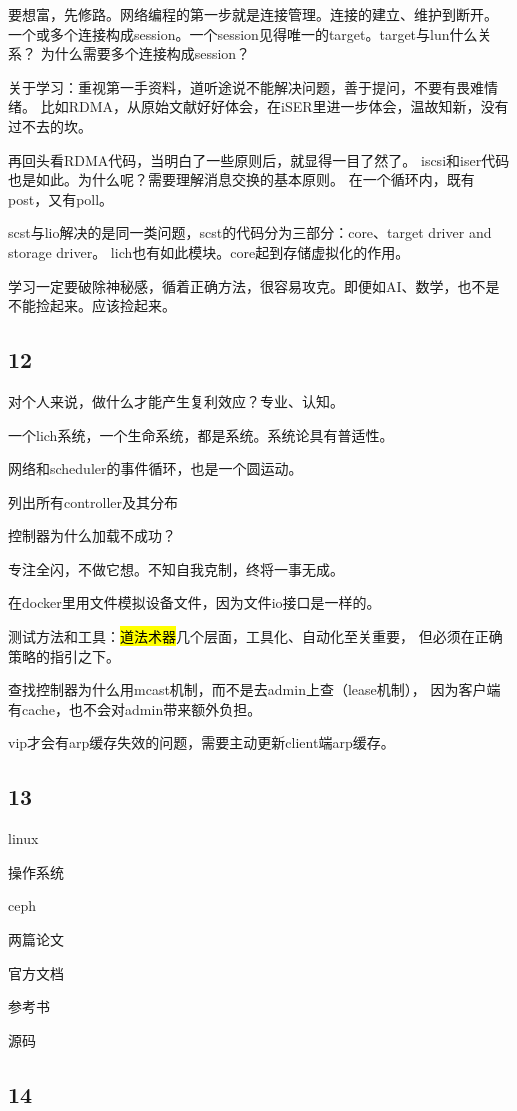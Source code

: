 要想富，先修路。网络编程的第一步就是连接管理。连接的建立、维护到断开。
一个或多个连接构成session。一个session见得唯一的target。target与lun什么关系？
为什么需要多个连接构成session？

关于学习：重视第一手资料，道听途说不能解决问题，善于提问，不要有畏难情绪。
比如RDMA，从原始文献好好体会，在iSER里进一步体会，温故知新，没有过不去的坎。

再回头看RDMA代码，当明白了一些原则后，就显得一目了然了。
iscsi和iser代码也是如此。为什么呢？需要理解消息交换的基本原则。
在一个循环内，既有post，又有poll。

scst与lio解决的是同一类问题，scst的代码分为三部分：core、target driver and storage driver。
lich也有如此模块。core起到存储虚拟化的作用。

学习一定要破除神秘感，循着正确方法，很容易攻克。即便如AI、数学，也不是不能捡起来。应该捡起来。

\subsection{12}

对个人来说，做什么才能产生复利效应？专业、认知。

一个lich系统，一个生命系统，都是系统。系统论具有普适性。

网络和scheduler的事件循环，也是一个圆运动。

\begin{enumbox}
\item 列出所有controller及其分布
\item 控制器为什么加载不成功？
\end{enumbox}

专注全闪，不做它想。不知自我克制，终将一事无成。

在docker里用文件模拟设备文件，因为文件io接口是一样的。

测试方法和工具：\hl{道法术器}几个层面，工具化、自动化至关重要，
但必须在正确策略的指引之下。

查找控制器为什么用mcast机制，而不是去admin上查（lease机制），
因为客户端有cache，也不会对admin带来额外负担。

vip才会有arp缓存失效的问题，需要主动更新client端arp缓存。

\subsection{13}

linux
\begin{enumbox}
\item 操作系统
\end{enumbox}

ceph
\begin{enumbox}
\item 两篇论文
\item 官方文档
\item 参考书
\item 源码
\end{enumbox}

\subsection{14}
